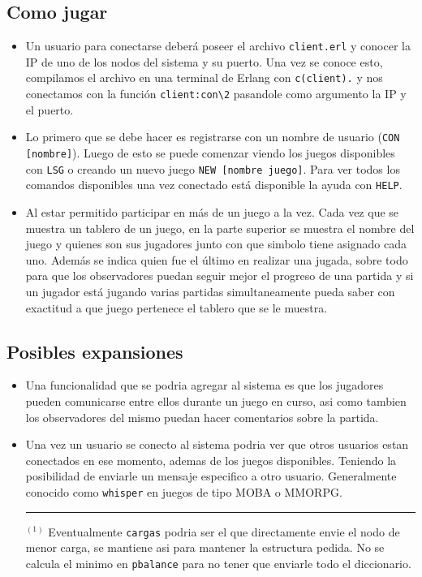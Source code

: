 \documentclass[a4paper]{article}
\newcommand{\blacktr}[0]{\item[$\blacktriangleright$]}
\begin{document}
\subsection*{Como jugar}
\begin{itemize}
   \blacktr Un usuario para conectarse deberá poseer el archivo \texttt{client.erl} y conocer la IP de uno de los nodos del sistema y su puerto. Una vez se conoce esto, compilamos el archivo en una terminal de Erlang con \texttt{c(client).} y nos conectamos con la función \texttt{client:con\textbackslash2} pasandole como argumento la IP y el puerto. 
  
  \blacktr Lo primero que se debe hacer es registrarse con un nombre de usuario (\texttt{CON [nombre]}). Luego de esto se puede comenzar viendo los juegos disponibles con \texttt{LSG} o creando un nuevo juego \texttt{NEW [nombre juego]}. Para ver todos los comandos disponibles una vez conectado está disponible la ayuda con \texttt{HELP}.

  \blacktr Al estar permitido participar en más de un juego a la vez. Cada vez que se muestra un tablero de un juego, en la parte superior se muestra el nombre del juego y quienes son sus jugadores junto con que simbolo tiene asignado cada uno. Además se indica quien fue el último en realizar una jugada, sobre todo para que los observadores puedan seguir mejor el progreso de una partida y si un jugador está jugando varias partidas simultaneamente pueda saber con exactitud a que juego pertenece el tablero que se le muestra.
\end{itemize}

\subsection*{Posibles expansiones}
\begin{itemize}
  \blacktr Una funcionalidad que se podria agregar al sistema es que los jugadores pueden comunicarse entre ellos durante un juego en curso, asi como tambien los observadores del mismo puedan hacer comentarios sobre la partida.

  \blacktr Una vez un usuario se conecto al sistema podria ver que otros usuarios estan conectados en ese momento, ademas de los juegos disponibles. Teniendo la posibilidad de enviarle un mensaje especifico a otro usuario. Generalmente conocido como \texttt{whisper} en juegos de tipo MOBA o MMORPG.




\rule{18cm}{0.4pt}
$^{(1)}$ Eventualmente \texttt{cargas} podria ser el que directamente envie el nodo de menor carga, se mantiene asi para mantener la estructura pedida. No se calcula el minimo en \texttt{pbalance} para no tener que enviarle todo el diccionario.
\end{itemize}
\end{document}
